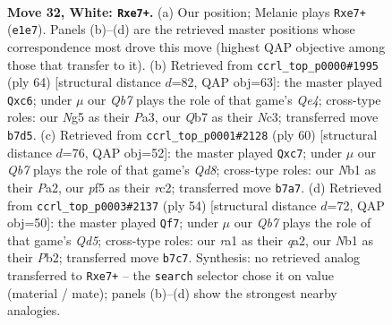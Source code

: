 \documentclass[11pt]{article}
\begin{document}
\clearpage

\begin{figure}[p]\centering
\begin{subfigure}{0.46\textwidth}\centering
\resizebox{\linewidth}{!}{%
\newchessgame
\chessboard[
  setfen={8/1Q2n1k1/6p1/3q1pNp/3p3P/3P2P1/5P2/rN2R1K1 w - - 4 32},
  showmover=false,
  pgfstyle=straightmove, color=movearrow, markmove={e1-e7}
]}
\caption{}
\end{subfigure}\hfill
\begin{subfigure}{0.46\textwidth}\centering
\resizebox{\linewidth}{!}{%
\newchessgame
\chessboard[
  setfen={6k1/p5p1/1pq4p/4p3/1P1nQ2P/P1N3P1/5P2/6K1 w - - 2 33},
  showmover=false,
  pgfstyle=straightmove, color=movearrow, markmove={e4-c6}
]}
\caption{}
\end{subfigure}
\\[4pt]
\begin{subfigure}{0.46\textwidth}\centering
\resizebox{\linewidth}{!}{%
\newchessgame
\chessboard[
  setfen={3Q1nk1/p1q2pp1/4p3/7p/4P3/1N3PP1/P1r4P/1K1R4 w - - 0 31},
  showmover=false,
  pgfstyle=straightmove, color=movearrow, markmove={d8-c7}
]}
\caption{}
\end{subfigure}\hfill
\begin{subfigure}{0.46\textwidth}\centering
\resizebox{\linewidth}{!}{%
\newchessgame
\chessboard[
  setfen={8/p1kn4/5p2/2pQr3/1pp5/6P1/qP1N1P1P/3R2K1 w - - 2 28},
  showmover=false,
  pgfstyle=straightmove, color=movearrow, markmove={d5-f7}
]}
\caption{}
\end{subfigure}
\caption{\textbf{Move 32, White: \texttt{Rxe7+}.} (a) Our position; Melanie plays \texttt{Rxe7+} (\texttt{e1e7}). Panels (b)--(d) are the retrieved master positions whose correspondence most drove this move (highest QAP objective among those that transfer to it). (b) Retrieved from \texttt{ccrl\_top\_p0000\#1995} (ply 64) [structural distance $d$=82, QAP obj=63]: the master played \texttt{Qxc6}; under $\mu$ our \emph{Qb7} plays the role of that game's \emph{Qe4}; cross-type roles: our \emph{N}g5 as their \emph{P}a3, our \emph{Q}b7 as their \emph{N}c3; transferred move \texttt{b7d5}. (c) Retrieved from \texttt{ccrl\_top\_p0001\#2128} (ply 60) [structural distance $d$=76, QAP obj=52]: the master played \texttt{Qxc7}; under $\mu$ our \emph{Qb7} plays the role of that game's \emph{Qd8}; cross-type roles: our \emph{N}b1 as their \emph{P}a2, our \emph{p}f5 as their \emph{r}c2; transferred move \texttt{b7a7}. (d) Retrieved from \texttt{ccrl\_top\_p0003\#2137} (ply 54) [structural distance $d$=72, QAP obj=50]: the master played \texttt{Qf7}; under $\mu$ our \emph{Qb7} plays the role of that game's \emph{Qd5}; cross-type roles: our \emph{r}a1 as their \emph{q}a2, our \emph{N}b1 as their \emph{P}b2; transferred move \texttt{b7c7}. Synthesis: no retrieved analog transferred to \texttt{Rxe7+} -- the \texttt{search} selector chose it on value (material / mate); panels (b)--(d) show the strongest nearby analogies.}
\label{fig:thought-m62}
\end{figure}
\end{document}
